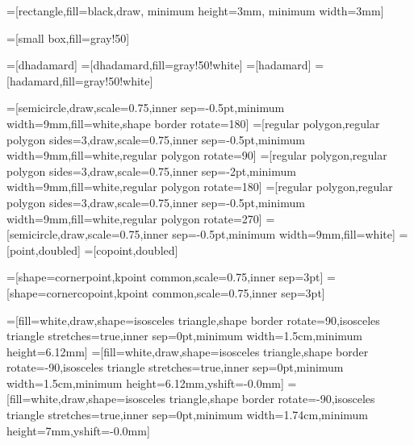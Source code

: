 =[rectangle,fill=black,draw, minimum height=3mm, minimum width=3mm]

=[small box,fill=gray!50]

=[dhadamard]
=[dhadamard,fill=gray!50!white]
=[hadamard]
=[hadamard,fill=gray!50!white]

=[semicircle,draw,scale=0.75,inner sep=-0.5pt,minimum width=9mm,fill=white,shape border rotate=180]
=[regular polygon,regular polygon sides=3,draw,scale=0.75,inner sep=-0.5pt,minimum width=9mm,fill=white,regular polygon rotate=90]
=[regular polygon,regular polygon sides=3,draw,scale=0.75,inner sep=-2pt,minimum width=9mm,fill=white,regular polygon rotate=180]
=[regular polygon,regular polygon sides=3,draw,scale=0.75,inner sep=-0.5pt,minimum width=9mm,fill=white,regular polygon rotate=270]
=[semicircle,draw,scale=0.75,inner sep=-0.5pt,minimum width=9mm,fill=white]
=[point,doubled]
=[copoint,doubled]

=[shape=cornerpoint,kpoint common,scale=0.75,inner sep=3pt]
=[shape=cornercopoint,kpoint common,scale=0.75,inner sep=3pt]

=[fill=white,draw,shape=isosceles triangle,shape border rotate=90,isosceles triangle stretches=true,inner sep=0pt,minimum width=1.5cm,minimum height=6.12mm]
=[fill=white,draw,shape=isosceles triangle,shape border rotate=-90,isosceles triangle stretches=true,inner sep=0pt,minimum width=1.5cm,minimum height=6.12mm,yshift=-0.0mm]
=[fill=white,draw,shape=isosceles triangle,shape border rotate=-90,isosceles triangle stretches=true,inner sep=0pt,minimum width=1.74cm,minimum height=7mm,yshift=-0.0mm]


